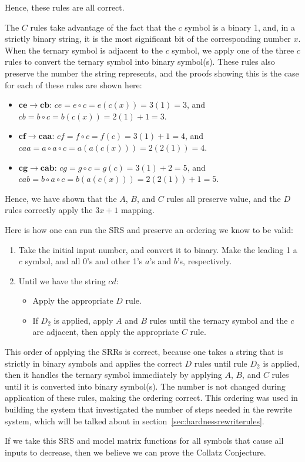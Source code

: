 Hence, these rules are all correct. \par
The $C$ rules take advantage of the fact that the $c$ symbol is a binary 1, and, in a strictly binary string, it is the most significant bit of the corresponding number $x$. When the ternary symbol is adjacent to the $c$ symbol, we apply one of the three $c$ rules to convert the ternary symbol into binary symbol(s). These rules also preserve the number the string represents, and the proofs showing this is the case for each of these rules are shown here:
\begin{itemize}
    \item $\boldsymbol{ce \rightarrow cb}$: $ce = e \circ c = e(c(x)) = 3(1) = 3$, and $cb = b
    \circ c = b(c(x)) = 2(1)+1 = 3$.
    \item $\boldsymbol{cf \rightarrow caa}$: $cf = f \circ c = f(c) = 3(1)+ 1 = 4$, and $caa = a \circ a \circ c = a(a(c(x))) = 2(2(1)) = 4$.
    \item $\boldsymbol{cg \rightarrow cab}$: $cg = g \circ c = g(c) = 3(1)+ 2 = 5$, and $cab = b \circ a \circ c = b(a(c(x))) = 2(2(1))+1 = 5$.
\end{itemize}
Hence, we have shown that the $A$, $B$, and $C$ rules all preserve value, and the $D$ rules correctly apply the $3x+1$ mapping. \par
Here is how one can run the SRS and preserve an ordering we know to be valid:
\begin{enumerate}
    \item Take the initial input number, and convert it to binary. Make the leading 1 a $c$ symbol, and all 0's and other 1's $a$'s and $b$'s, respectively.
    \item Until we have the string $cd$: 
    \begin{itemize}
        \item Apply the appropriate $D$ rule.
        \item If $D_2$ is applied, apply $A$ and $B$ rules until the ternary symbol and the $c$ are adjacent, then apply the appropriate $C$ rule.
    \end{itemize}
\end{enumerate}
This order of applying the SRRs is correct, because one takes a string that is strictly in binary symbols and applies the correct $D$ rules until rule $D_2$ is applied, then it handles the ternary symbol immediately by applying $A$, $B$, and $C$ rules until it is converted into binary symbol(s). The number is not changed during application of these rules, making the ordering correct. This ordering was used in building the system that investigated the number of steps needed in the rewrite system, which will be talked about in section~\ref{sec:hardnessrewriterules}. \par
If we take this SRS and model matrix functions for all symbols that cause all inputs to decrease, then we believe we can prove the Collatz Conjecture.

